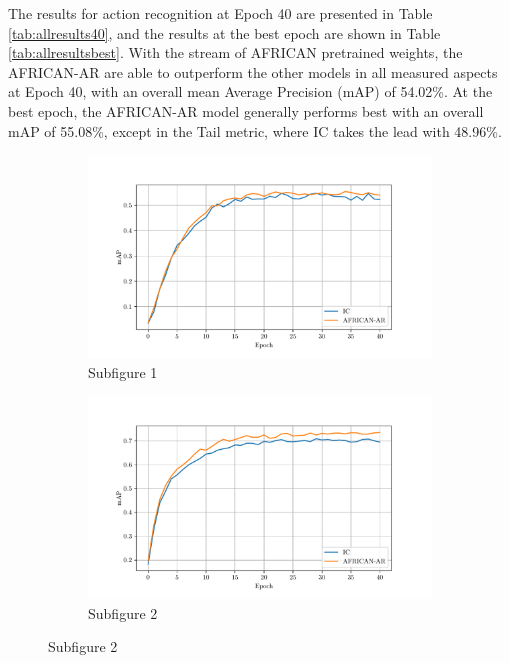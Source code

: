 The results for action recognition at Epoch 40 are presented in Table \ref{tab:allresults40}, and the results at the best epoch are shown in Table \ref{tab:allresultsbest}. With the stream of AFRICAN pretrained weights, the AFRICAN-AR are able to outperform the other models in all measured aspects at Epoch 40, with an overall mean Average Precision (mAP) of 54.02\%. At the best epoch, the AFRICAN-AR model generally performs best with an overall mAP of 55.08\%, except in the Tail metric, where IC takes the lead with 48.96\%.


\begin{figure}
    \centering
    \begin{adjustwidth}{-0.2\linewidth}{-0.07\linewidth}
    \begin{subfigure}[b]{0.7\textwidth}
        \includegraphics[width=\textwidth]{assets/charts/4_4_finalscore_0_overall.pdf}
        \caption{Subfigure 1}
        \label{fig:subfig1}
    \end{subfigure}
    \begin{subfigure}[b]{0.7\textwidth}
        \includegraphics[width=\textwidth]{assets/charts/4_4_finalscore_1_head.pdf}
        \caption{Subfigure 2}
        \label{fig:subfig2}
    \end{subfigure}


\end{adjustwidth}
\end{figure}
